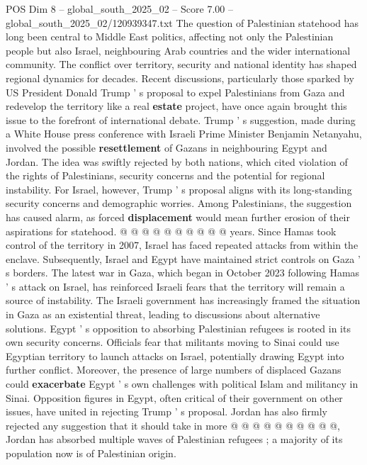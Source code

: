 \begin{textsample}{POS Dim 8 – global\_south\_2025\_02 – Score 7.00 – global\_south\_2025\_02/120939347.txt}  \label{ex:f8_pos_076}
The question of Palestinian statehood has long been central to Middle East politics, affecting not only the Palestinian people but also Israel, neighbouring Arab countries and the wider international community.
The conflict over territory, security and national identity has shaped regional dynamics for decades.
Recent discussions, particularly those sparked by US President Donald Trump ' s proposal to expel Palestinians from Gaza and redevelop the territory like a real \textbf{estate} project, have once again brought this issue to the forefront of international debate.
Trump ' s suggestion, made during a White House press conference with Israeli Prime Minister Benjamin Netanyahu, involved the possible \textbf{resettlement} of Gazans in neighbouring Egypt and Jordan.
The idea was swiftly rejected by both nations, which cited violation of the rights of Palestinians, security concerns and the potential for regional instability.
For Israel, however, Trump ' s proposal aligns with its long-standing security concerns and demographic worries.
Among Palestinians, the suggestion has caused alarm, as forced \textbf{displacement} would mean further erosion of their aspirations for statehood. @ @ @ @ @ @ @ @ @ @ years.
Since Hamas took control of the territory in 2007, Israel has faced repeated attacks from within the enclave.
Subsequently, Israel and Egypt have maintained strict controls on Gaza ' s borders.
The latest war in Gaza, which began in October 2023 following Hamas ' s attack on Israel, has reinforced Israeli fears that the territory will remain a source of instability.
The Israeli government has increasingly framed the situation in Gaza as an existential threat, leading to discussions about alternative solutions.
Egypt ' s opposition to absorbing Palestinian refugees is rooted in its own security concerns.
Officials fear that militants moving to Sinai could use Egyptian territory to launch attacks on Israel, potentially drawing Egypt into further conflict.
Moreover, the presence of large numbers of displaced Gazans could \textbf{exacerbate} Egypt ' s own challenges with political Islam and militancy in Sinai.
Opposition figures in Egypt, often critical of their government on other issues, have united in rejecting Trump ' s proposal.
Jordan has also firmly rejected any suggestion that it should take in more @ @ @ @ @ @ @ @ @ @, Jordan has absorbed multiple waves of Palestinian refugees ; a majority of its population now is of Palestinian origin.

\end{textsample}

